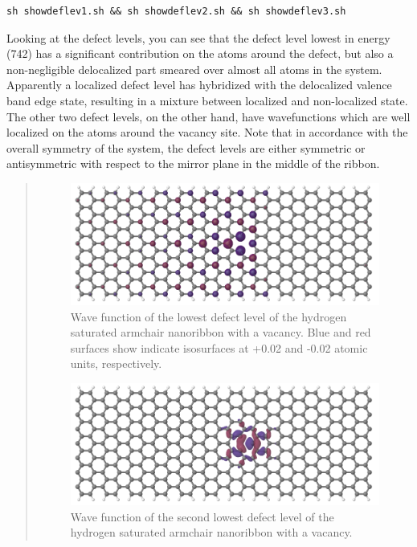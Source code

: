 \documentclass[a4paper,11pt,english]{sphinxmanual}
\begin{document}
{{\begin{Verbatim}[commandchars=\\\{\}]
sh showdeflev1.sh && sh showdeflev2.sh && sh showdeflev3.sh
\end{Verbatim}

Looking at the defect levels, you can see that the defect level lowest
in energy (742) has a significant contribution on the atoms around the
defect, but also a non-negligible delocalized part smeared over almost
all atoms in the system. Apparently a localized defect level has
hybridized with the delocalized valence band edge state, resulting in
a mixture between localized and non-localized state. The other two
defect levels, on the other hand, have wavefunctions which are well
localized on the atoms around the vacancy site. Note that in
accordance with the overall symmetry of the system, the defect levels
are either symmetric or antisymmetric with respect to the mirror plane
in the middle of the ribbon.
\begin{quote}
\vskip -0.2cm
\begin{figure}[htbp]
\centering
\capstart
\includegraphics[width=0.650\linewidth]{armchair-v2-def1.png}
\caption{Wave function of the lowest defect level of the hydrogen
saturated armchair nanoribbon with a vacancy. Blue and red
surfaces show indicate isosurfaces at +0.02 and -0.02 atomic
units, respectively.}\label{electstruct:fig-armchair-v2-def1}
\end{figure}
\vskip -0.2cm
\begin{figure}[htbp]
\centering
\capstart
\includegraphics[width=0.650\linewidth]{armchair-v2-def2.png}
\caption{Wave function of the second lowest defect level of the hydrogen
saturated armchair nanoribbon with a vacancy.}\label{electstruct:fig-armchair-v2-def2}
\end{figure}

\end{quote}}}
\end{document}
